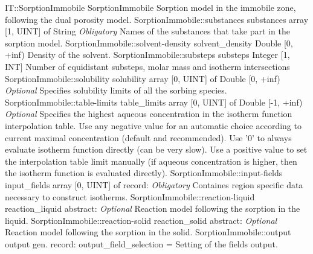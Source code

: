 \begin{RecordType}
	{IT::SorptionImmobile}
	{SorptionImmobile}
	{}%
	{}%
	{{{Sorption model in the immobile zone, following the dual porosity model.}%
}}
		\RecKey
			{SorptionImmobile::substances}
			{substances}
			{{array [1, UINT] of }{String}}{}
			{ \it{Obligatory}}
			{{{Names of the substances that take part in the sorption model.}%
}}
		\RecKey
			{SorptionImmobile::solvent-density}
			{solvent{\_}density}
			{{Double [0, +inf)}}{}
			{ }
			{{{Density of the solvent.}%
}}
		\RecKey
			{SorptionImmobile::substeps}
			{substeps}
			{{Integer [1, INT]}}{}
			{ }
			{{{Number of equidistant substeps, molar mass and isotherm intersections}%
}}
		\RecKey
			{SorptionImmobile::solubility}
			{solubility}
			{{array [0, UINT] of }{Double [0, +inf)}}{}
			{ \it{Optional}}
			{{{Specifies solubility limits of all the sorbing species.}%
}}
		\RecKey
			{SorptionImmobile::table-limits}
			{table{\_}limits}
			{{array [0, UINT] of }{Double [-1, +inf)}}{}
			{ \it{Optional}}
			{{{Specifies the highest aqueous concentration in the isotherm function interpolation table.
Use any negative value for an automatic choice according to current maximal concentration (default and recommended). Use '0' to always evaluate isotherm function directly (can be very slow). Use a positive value to set the interpolation table limit manually (if aqueous concentration is higher, then the isotherm function is evaluated directly).}%
}}
		\RecKey
			{SorptionImmobile::input-fields}
			{input{\_}fields}
			{{array [0, UINT] of }{record: }}{}
			{ \it{Obligatory}}
			{{{Containes region specific data necessary to construct isotherms.}%
}}
		\RecKey
			{SorptionImmobile::reaction-liquid}
			{reaction{\_}liquid}
			{{abstract: }}{}
			{ \it{Optional}}
			{{{Reaction model following the sorption in the liquid.}%
}}
		\RecKey
			{SorptionImmobile::reaction-solid}
			{reaction{\_}solid}
			{{abstract: }}{}
			{ \it{Optional}}
			{{{Reaction model following the sorption in the solid.}%
}}
		\RecKey
			{SorptionImmobile::output}
			{output}
			{{gen. record: }}{{output{\_}field{\_}selection}{ = }}
			{ }
			{{{Setting of the fields output.}%
}}
\end{RecordType}
